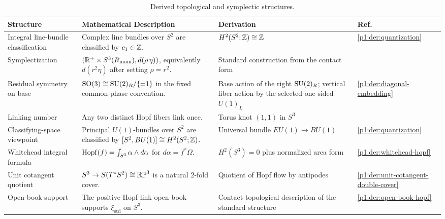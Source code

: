 \documentclass[11pt]{article}
\begin{document}
\begin{table}[htbp]
\centering
\small
\begingroup
\renewcommand{\arraystretch}{1.2}
\setlength{\tabcolsep}{2.5pt}

\begin{tabular}{|
  L{3.0cm}|
  L{\dimexpr\linewidth-3.0cm-4.0cm-1.2cm-8\arrayrulewidth\relax}|
  L{4.0cm}|
  C{1.2cm}|
}
\hline
\textbf{Structure} & \textbf{Mathematical Description} & \textbf{Derivation} & \textbf{Ref.} \\
\hline

Integral line-bundle classification
& Complex line bundles over \(S^2\) are classified by \(c_1\in\mathbb{Z}\).
& \(H^2(S^2;\mathbb{Z})\cong\mathbb{Z}\)
& \ref{p1:der:quantization} \\
\hline

Symplectization
& \((\mathbb{R}^+ \times S^3(R_{\mathrm{mom}}), d(\rho\,\eta))\), equivalently
  \(d(r^2\eta)\) after setting \(\rho=r^2\).
& Standard construction from the contact form
& \cite{geiges2008contact} \\
\hline

Residual symmetry on base
& \(\mathrm{SO}(3) \cong \mathrm{SU}(2)_R/\{\pm 1\}\) in the fixed common-phase convention.
& Base action of the right \(\mathrm{SU}(2)_R\); vertical fiber action by the selected
  one-sided \(U(1)_L\)
& \ref{p1:der:diagonal-embedding} \\
\hline

Linking number
& Any two distinct Hopf fibers link once.
& Torus knot \((1,1)\) in \(S^3\)
& \cite{rolfsen1976knots} \\
\hline

Classifying-space viewpoint
& Principal \(U(1)\)-bundles over \(S^2\) are classified by
  \([S^2,BU(1)]\cong H^2(S^2;\mathbb{Z})\).
& Universal bundle \(EU(1)\to BU(1)\)
& \ref{p1:der:quantization} \\
\hline

Whitehead integral formula
& \(\operatorname{Hopf}(f)=\int_{S^3}\alpha\wedge d\alpha\) for \(d\alpha=f^*\Omega\).
& \(H^2(S^3)=0\) plus normalized area form
& \ref{p1:der:whitehead-hopf} \\
\hline

Unit cotangent quotient
& \(S^3\to S(T^*S^2)\cong \mathbb{RP}^3\) is a natural \(2\)-fold cover.
& Quotient of Hopf flow by antipodes
& \ref{p1:der:unit-cotangent-double-cover} \\
\hline

Open-book support
& The positive Hopf-link open book supports \(\xi_{\mathrm{std}}\) on \(S^3\).
& Contact-topological description of the standard structure
& \ref{p1:der:open-book-hopf} \\
\hline

\end{tabular}

\caption[Derived topological and symplectic structures]{Derived topological and symplectic structures.}
\label{p1:tab:derived-topological}
\endgroup
\end{table}
\end{document}
